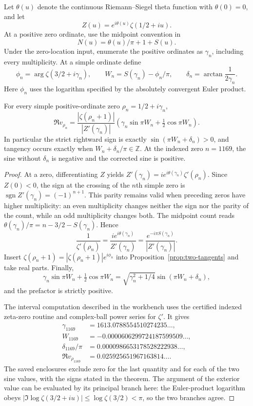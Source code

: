Let $\theta(u)$ denote the continuous Riemann--Siegel theta function with $\theta(0)=0$, and let
\[
 Z(u)=e^{i\theta(u)}\zeta(1/2+iu).
\]
At a positive zero ordinate, use the midpoint convention in
\[
 N(u)=\theta(u)/\pi+1+S(u).
\]
Under the zero-location input, enumerate the positive ordinates as $\gamma_n$, including every multiplicity. At a simple ordinate define
\[
 \phi_n=\arg\zeta(3/2+i\gamma_n),\qquad
 W_n=S(\gamma_n)-\phi_n/\pi,\qquad
 \delta_n=\arctan\frac1{2\gamma_n}.
\]
Here $\phi_n$ uses the logarithm specified by the absolutely convergent Euler product.

\begin{theorem}\label{thm:hurwitz-sign}
For every simple positive-ordinate zero $\rho_n=1/2+i\gamma_n$,
\[
 \Re v_{\rho_n}
 =\frac{|\zeta(\rho_n+1)|}{|Z'(\gamma_n)|}
       \left(\gamma_n\sin\pi W_n+\tfrac12\cos\pi W_n\right).
\]
In particular the strict rightward sign is exactly
$\sin(\pi W_n+\delta_n)>0$, and tangency occurs exactly when
$W_n+\delta_n/\pi\in\mathbb Z$.
At the indexed zero $n=1169$, the sine without $\delta_n$ is negative and the corrected sine is positive.
\end{theorem}
\begin{proof}
At a zero, differentiating $Z$ yields
$Z'(\gamma_n)=ie^{i\theta(\gamma_n)}\zeta'(\rho_n)$.
Since $Z(0)<0$, the sign at the crossing of the $n$th simple zero is
$\operatorname{sgn}Z'(\gamma_n)=(-1)^{n+1}$. This parity remains valid when preceding zeros have higher multiplicity: an even multiplicity changes neither the sign nor the parity of the count, while an odd multiplicity changes both.
The midpoint count reads
$\theta(\gamma_n)/\pi=n-3/2-S(\gamma_n)$. Hence
\[
 \frac1{\zeta'(\rho_n)}
 =\frac{ie^{i\theta(\gamma_n)}}{Z'(\gamma_n)}
 =\frac{e^{-i\pi S(\gamma_n)}}{|Z'(\gamma_n)|}.
\]
Insert $\zeta(\rho_n+1)=|\zeta(\rho_n+1)|e^{i\phi_n}$ into
Proposition~\ref{prop:two-tangents} and take real parts. Finally,
\[
 \gamma_n\sin\pi W_n+\tfrac12\cos\pi W_n
 =\sqrt{\gamma_n^2+1/4}\sin(\pi W_n+\delta_n),
\]
and the prefactor is strictly positive.

The interval computation described in the workbench uses the certified indexed zeta-zero routine and complex-ball power series for $\zeta'$. It gives
\begin{align*}
 \gamma_{1169}&=1613.0788554510274235\ldots,\\
 W_{1169}&=-0.0000606299724187599509\ldots,\\
 \delta_{1169}/\pi&=0.0000986653178528222938\ldots,\\
 \Re v_{\rho_{1169}}&=0.025925651967163814\ldots.
\end{align*}
The saved enclosures exclude zero for the last quantity and for each of the two sine values, with the signs stated in the theorem. The argument of the exterior value can be evaluated by its principal branch here: the Euler-product logarithm obeys
$|\Im\log\zeta(3/2+iu)|\le\log\zeta(3/2)<\pi$, so the two branches agree.
\end{proof}

